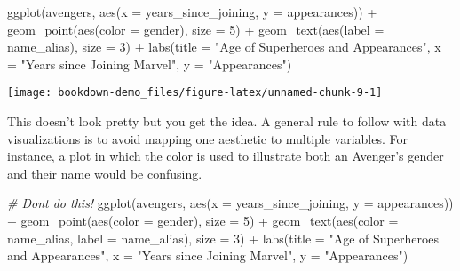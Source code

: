 \documentclass[
]{book}
\newenvironment{Shaded}{\begin{snugshade}}{\end{snugshade}}
\newcommand{\AttributeTok}[1]{\textcolor[rgb]{0.77,0.63,0.00}{#1}}
\newcommand{\CommentTok}[1]{\textcolor[rgb]{0.56,0.35,0.01}{\textit{#1}}}
\newcommand{\DecValTok}[1]{\textcolor[rgb]{0.00,0.00,0.81}{#1}}
\newcommand{\FunctionTok}[1]{\textcolor[rgb]{0.00,0.00,0.00}{#1}}
\newcommand{\NormalTok}[1]{#1}
\newcommand{\SpecialCharTok}[1]{\textcolor[rgb]{0.00,0.00,0.00}{#1}}
\newcommand{\StringTok}[1]{\textcolor[rgb]{0.31,0.60,0.02}{#1}}
\begin{document}
\begin{Shaded}
\begin{Highlighting}[]
\FunctionTok{ggplot}\NormalTok{(avengers, }\FunctionTok{aes}\NormalTok{(}\AttributeTok{x =}\NormalTok{ years\_since\_joining, }\AttributeTok{y =}\NormalTok{ appearances)) }\SpecialCharTok{+}
  \FunctionTok{geom\_point}\NormalTok{(}\FunctionTok{aes}\NormalTok{(}\AttributeTok{color =}\NormalTok{ gender), }\AttributeTok{size =} \DecValTok{5}\NormalTok{) }\SpecialCharTok{+}
  \FunctionTok{geom\_text}\NormalTok{(}\FunctionTok{aes}\NormalTok{(}\AttributeTok{label =}\NormalTok{ name\_alias), }\AttributeTok{size =} \DecValTok{3}\NormalTok{) }\SpecialCharTok{+}
  \FunctionTok{labs}\NormalTok{(}\AttributeTok{title =} \StringTok{"\textquotesingle{}Age\textquotesingle{} of Superheroes and Appearances"}\NormalTok{,}
       \AttributeTok{x =} \StringTok{"Years since Joining Marvel"}\NormalTok{,}
       \AttributeTok{y =} \StringTok{"Appearances"}\NormalTok{)}
\end{Highlighting}
\end{Shaded}

\begin{center}\texttt{[image: bookdown-demo\_files/figure-latex/unnamed-chunk-9-1]} \end{center}

This doesn't look pretty but you get the idea. A general rule to follow with data visualizations is to avoid mapping one aesthetic to multiple variables. For instance, a plot in which the color is used to illustrate both an Avenger's gender and their name would be confusing.

\begin{Shaded}
\begin{Highlighting}[]
\CommentTok{\# Don\textquotesingle{}t do this!}
\FunctionTok{ggplot}\NormalTok{(avengers, }\FunctionTok{aes}\NormalTok{(}\AttributeTok{x =}\NormalTok{ years\_since\_joining, }\AttributeTok{y =}\NormalTok{ appearances)) }\SpecialCharTok{+}
  \FunctionTok{geom\_point}\NormalTok{(}\FunctionTok{aes}\NormalTok{(}\AttributeTok{color =}\NormalTok{ gender), }\AttributeTok{size =} \DecValTok{5}\NormalTok{) }\SpecialCharTok{+}
  \FunctionTok{geom\_text}\NormalTok{(}\FunctionTok{aes}\NormalTok{(}\AttributeTok{color =}\NormalTok{ name\_alias, }\AttributeTok{label =}\NormalTok{ name\_alias), }\AttributeTok{size =} \DecValTok{3}\NormalTok{) }\SpecialCharTok{+}
  \FunctionTok{labs}\NormalTok{(}\AttributeTok{title =} \StringTok{"\textquotesingle{}Age\textquotesingle{} of Superheroes and Appearances"}\NormalTok{,}
       \AttributeTok{x =} \StringTok{"Years since Joining Marvel"}\NormalTok{,}
       \AttributeTok{y =} \StringTok{"Appearances"}\NormalTok{)}
\end{Highlighting}
\end{Shaded}
\end{document}
